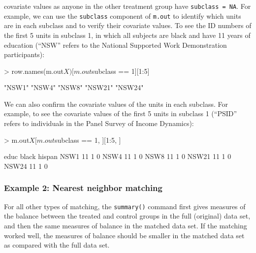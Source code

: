 \documentclass[oneside,letterpaper,titlepage]{article}
\begin{document}
covariate values as anyone in the other treatment group have
\texttt{subclass = NA}.  For example, we can use the {\tt subclass}
component of {\tt m.out} to identify which units are in each subclass
and to verify their covariate values.  To see the ID numbers of the
first 5 units in subclass 1, in which all subjects are black and have
11 years of education (``NSW'' refers to the National Supported Work
Demonstration participants):
\begin{Schunk}
\begin{Sinput}
> row.names(m.out$X)[m.out$subclass == 1][1:5]
\end{Sinput}
\begin{Soutput}
[1] "NSW1"  "NSW4"  "NSW8"  "NSW21" "NSW24"
\end{Soutput}
\end{Schunk}
We can also confirm the covariate values of the units in each
subclass.  For example, to see the covariate values of the first 5
units in subclass 1 (``PSID'' refers to individuals in the Panel
Survey of Income Dynamics):
\begin{Schunk}
\begin{Sinput}
> m.out$X[m.out$subclass == 1, ][1:5, ]
\end{Sinput}
\begin{Soutput}
      educ black hispan
NSW1    11     1      0
NSW4    11     1      0
NSW8    11     1      0
NSW21   11     1      0
NSW24   11     1      0
\end{Soutput}
\end{Schunk}

\subsubsection{Example 2: Nearest neighbor matching}
\label{subsubsec:balancenearest}
For all other types of matching, the \texttt{summary()} command
  first gives measures of the balance between the treated and control
  groups in the full (original) data set, and then the same measures
  of balance in the matched data set.  If the matching worked well,
  the measures of balance should be smaller in the matched data set as
  compared with the full data set.
  
\end{document}
